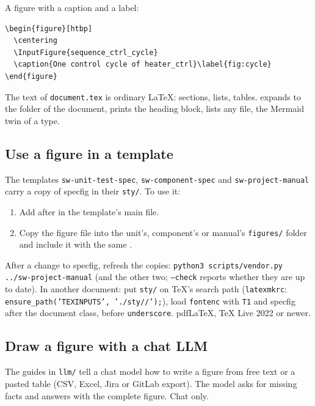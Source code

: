 A figure with a caption and a label:

\begin{Verbatim}[frame=single]
\begin{figure}[htbp]
  \centering
  \InputFigure{sequence_ctrl_cycle}
  \caption{One control cycle of heater_ctrl}\label{fig:cycle}
\end{figure}
\end{Verbatim}

The text of \texttt{document.tex} is ordinary LaTeX: sections, lists, tables.  expands to the folder of the document,  prints the heading block,  lists any file,  the Mermaid twin of a type.

\subsection{Use a figure in a template}

The templates \texttt{sw-unit-test-spec}, \texttt{sw-component-spec} and \texttt{sw-project-manual} carry a copy of specfig in their \texttt{sty/}. To use it:

\begin{enumerate}
  \item Add  after  in the template's main file.
  \item Copy the figure file into the unit's, component's or manual's \texttt{figures/} folder and include it with the same .
\end{enumerate}

After a change to specfig, refresh the copies: \texttt{python3 scripts/vendor.py ../sw-project-manual} (and the other two; \texttt{--check} reports whether they are up to date). In another document: put \texttt{sty/} on TeX's search path (\texttt{latexmkrc}: \texttt{ensure_path('TEXINPUTS', './sty//');}), load \texttt{fontenc} with \texttt{T1} and specfig after the document class, before \texttt{underscore}. pdfLaTeX, TeX Live 2022 or newer.

\subsection{Draw a figure with a chat LLM}\label{sec:llm}

The guides in \texttt{llm/} tell a chat model how to write a figure from free text or a pasted table (CSV, Excel, Jira or GitLab export). The model asks for missing facts and answers with the complete figure. Chat only.

